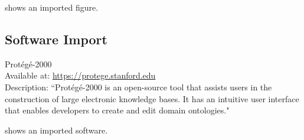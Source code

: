  shows an imported figure.

\subsection{Software Import}


 \begin{software}
 Prot{\'{e}}g{\'{e}}-2000~\cite{DBLP:conf/amia/NoyCFKTVM03}\\
 Available at: \url{https://protege.stanford.edu}\\
 Description: ``Prot\'{e}g\'{e}-2000 is an open-source tool that assists users in the construction of large electronic knowledge bases. It has an intuitive user interface that enables developers to create and edit domain ontologies."~\cite{DBLP:conf/amia/NoyCFKTVM03}
 \label{software:protege}
 \end{software}
 
 shows an imported software.


